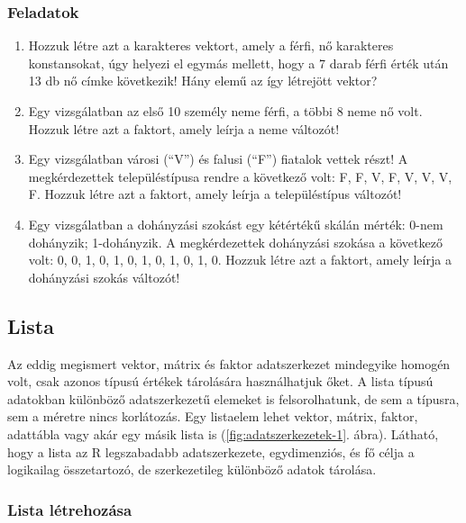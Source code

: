 \documentclass[
]{book}
\makeatletter
\providecommand{\tightlist}{%
  \setlength{\itemsep}{0pt}\setlength{\parskip}{0pt}}
\newenvironment{kframe}{%
\medskip{}
\setlength{\fboxsep}{.8em}
 \def\at@end@of@kframe{}%
 \ifinner\ifhmode%
  \def\at@end@of@kframe{\end{minipage}}%
  \begin{minipage}{\columnwidth}%
 \fi\fi%
 \def\FrameCommand##1{\hskip\@totalleftmargin \hskip-\fboxsep
 \colorbox{shadecolor}{##1}\hskip-\fboxsep
     \hskip-\linewidth \hskip-\@totalleftmargin \hskip\columnwidth}%
 \MakeFramed {\advance\hsize-\width
   \@totalleftmargin\z@ \linewidth\hsize
   \@setminipage}}%
 {\par\unskip\endMakeFramed%
 \at@end@of@kframe}
\newenvironment{rmdblock}[1]
  {
  \begin{itemize}
  \renewcommand{\labelitemi}{
    \raisebox{-.7\height}[0pt][0pt]{
      {\setkeys{Gin}{width=3em,keepaspectratio}\texttt{[image: images/\#1]}}
    }
  }
  \setlength{\fboxsep}{1em}
  \begin{kframe}
  \item
  }
  {
  \end{kframe}
  \end{itemize}
  }
\newenvironment{rmdexercise}
  {\begin{rmdblock}{exercise}}
  {\end{rmdblock}}
\makeatother
\begin{document}
\hypertarget{az-r-nyelv-7-exercise}{%
\subsubsection{Feladatok}\label{az-r-nyelv-7-exercise}}

\begin{rmdexercise}
\begin{enumerate}
\def\labelenumi{\arabic{enumi}.}
\tightlist
\item
  Hozzuk létre azt a karakteres vektort, amely a férfi, nő karakteres konstansokat, úgy helyezi el egymás mellett, hogy a 7 darab férfi érték után 13 db nő címke következik! Hány elemű az így létrejött vektor?
\item
  Egy vizsgálatban az első 10 személy neme férfi, a többi 8 neme nő volt. Hozzuk létre azt a faktort, amely leírja a neme változót!
\item
  Egy vizsgálatban városi (``V'') és falusi (``F'') fiatalok vettek részt! A megkérdezettek településtípusa rendre a következő volt: F, F, V, F, V, V, V, F. Hozzuk létre azt a faktort, amely leírja a településtípus változót!
\item
  Egy vizsgálatban a dohányzási szokást egy kétértékű skálán mérték: 0-nem dohányzik; 1-dohányzik. A megkérdezettek dohányzási szokása a következő volt: 0, 0, 1, 0, 1, 0, 1, 0, 1, 0, 1, 0. Hozzuk létre azt a faktort, amely leírja a dohányzási szokás változót!
\end{enumerate}
\end{rmdexercise}

\hypertarget{listadefalf}{%
\subsection{Lista}\label{listadefalf}}

Az eddig megismert vektor, mátrix és faktor adatszerkezet mindegyike homogén volt, csak azonos típusú értékek tárolására használhatjuk őket. A lista típusú adatokban különböző adatszerkezetű elemeket is felsorolhatunk, de sem a típusra, sem a méretre nincs korlátozás. Egy listaelem lehet vektor, mátrix, faktor, adattábla vagy akár egy másik lista is (\ref{fig:adatszerkezetek-1}. ábra). Látható, hogy a lista az R legszabadabb adatszerkezete, egydimenziós, és fő célja a logikailag összetartozó, de szerkezetileg különböző adatok tárolása.

\hypertarget{lista-luxe9trehozuxe1sa}{%
\subsubsection{Lista létrehozása}\label{lista-luxe9trehozuxe1sa}}
\end{document}
